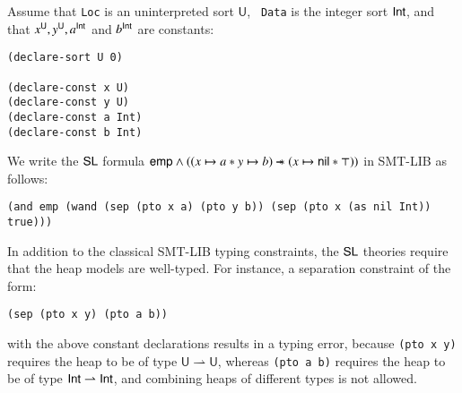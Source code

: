 \documentclass{llncs}
\begin{document}

Assume that {\tt Loc} is an uninterpreted sort $\mathsf{U}$, {\tt
  Data} is the integer sort $\mathsf{Int}$, and that $x^{\mathsf{U}}, y^{\mathsf{U}},
a^{\mathsf{Int}}$ and $b^{\mathsf{Int}}$ are constants: 
\begin{verbatim}
(declare-sort U 0)

(declare-const x U)
(declare-const y U)
(declare-const a Int)
(declare-const b Int)
\end{verbatim}
We write the $\mathsf{SL}$ formula \(\mathsf{emp} \wedge ((x \mapsto a * y \mapsto
b) \mathrel{\mbox{$\hspace*{-0.03em}\mathord{-}\hspace*{-0.66em} \mathord{-}\hspace*{-0.36em}\mathord{*}$\hspace*{-0.005em}}} (x \mapsto \mathsf{nil} * \top))\) in SMT-LIB as follows:
\begin{verbatim}
(and emp (wand (sep (pto x a) (pto y b)) (sep (pto x (as nil Int)) true)))
\end{verbatim}
In addition to the classical SMT-LIB typing constraints, the $\mathsf{SL}$
theories require that the heap models are well-typed. For instance, a
separation constraint of the form: 
\begin{verbatim}
(sep (pto x y) (pto a b))
\end{verbatim}
with the above constant declarations results in a typing error,
because {\tt (pto x y)} requires the heap to be of type $\mathsf{U}
\rightharpoonup \mathsf{U}$, whereas {\tt (pto a b)} requires the heap
to be of type $\mathsf{Int} \rightharpoonup \mathsf{Int}$, and combining heaps of
different types is not allowed. 

\end{document}
